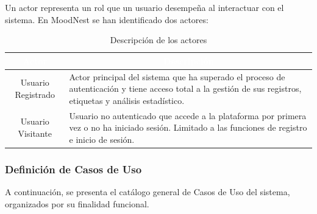 Un actor representa un rol que un usuario desempeña al interactuar con el sistema. En MoodNest se han identificado dos actores:


\begin{table}[h!]
    \centering
    \renewcommand{\arraystretch}{1.5}
    \begin{tabularx}{\textwidth}{|c|X|}
        \hline
        \rowcolor{UCO} 
        \textcolor{white}{\textbf{Actor}} & \multicolumn{1}{c|}{\textcolor{white}{\textbf{Descripción}}} \\ \hline
        Usuario Registrado & Actor principal del sistema que ha superado el proceso de autenticación y tiene acceso total a la gestión de sus registros, etiquetas y análisis estadístico. \\ \hline
        Usuario Visitante & Usuario no autenticado que accede a la plataforma por primera vez o no ha iniciado sesión. Limitado a las funciones de registro e inicio de sesión. \\ \hline
    \end{tabularx}
    \caption{Descripción de los actores}
    \label{tab:actores}
\end{table}

\subsubsection{Definición de Casos de Uso}

A continuación, se presenta el catálogo general de Casos de Uso del sistema, organizados por su finalidad funcional.


